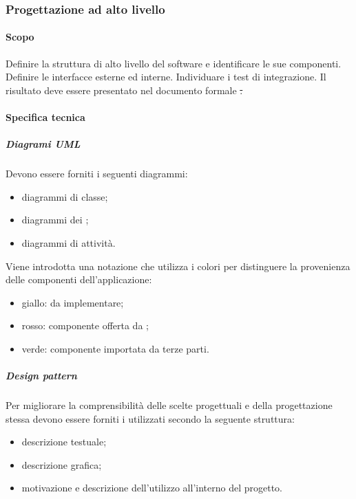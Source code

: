             \subsubsection{Progettazione ad alto livello}
                \paragraph{Scopo}
                Definire la struttura di alto livello del software e identificare le sue componenti. Definire le interfacce esterne ed interne. Individuare i test di integrazione. Il risultato deve essere presentato nel documento formale \st.
                \paragraph{Specifica tecnica}
                \subparagraph{Diagrami UML}
                Devono essere forniti i seguenti diagrammi:
                \begin{itemize}
                    \item diagrammi di classe;
                    \item diagrammi dei ;
                    \item diagrammi di attività.
                \end{itemize}
	            Viene introdotta una notazione che utilizza i colori per distinguere la provenienza delle componenti dell'applicazione:
	            \begin{itemize}
	            	\item giallo:  da implementare;
	            	\item rosso: componente offerta da \riskapp;
	            	\item verde: componente importata da terze parti.
	            \end{itemize}
                \subparagraph{Design pattern}
                Per migliorare la comprensibilità delle scelte progettuali e della progettazione stessa devono essere forniti i  utilizzati secondo la seguente struttura:
	            \begin{itemize}
	            	\item descrizione testuale;
	            	\item descrizione grafica;
	            	\item motivazione e descrizione dell'utilizzo all'interno del progetto.
	            \end{itemize}
            
